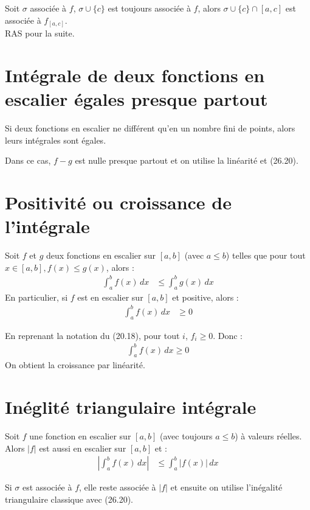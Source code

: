\documentclass[../main.tex]{subfiles}
\begin{document}
\noindent Soit $\sigma$ associée à $f$, $\sigma \cup \{c\}$ est toujours associée à $f$, alors $\sigma \cup \{c\} \cap [a, c]$ est associée à $f_{[a,c]}$. \\
RAS pour la suite. 

\section{Intégrale de deux fonctions en escalier égales presque partout}
\begin{tcolorbox}[title=Propostion 26.23, title filled=false, colframe=lightblue, colback=lightblue!10!white]
    Si deux fonctions en escalier ne différent qu'en un nombre fini de points, alors leurs intégrales sont égales.
\end{tcolorbox}

\noindent Dans ce cas, $f-g$ est nulle presque partout et on utilise la linéarité et (26.20). 

\section{Positivité ou croissance de l'intégrale}
\begin{tcolorbox}[title=Propostion 26.24, title filled=false, colframe=lightblue, colback=lightblue!10!white]
    Soit $f$ et $g$ deux fonctions en escalier sur $[a,b]$ (avec $a\leq b$) telles que pour tout $x\in [a, b], f(x) \leq g(x)$, alors : 
    \begin{align*}
        \int_{a}^{b} f(x) \,dx &\leq \int_{a}^{b} g(x) \,dx
    \end{align*}
    En particulier, si $f$ est en escalier sur $[a,b]$ et positive, alors :
    \begin{align*}
        \int_{a}^{b} f(x) \,dx &\geq 0
    \end{align*}
\end{tcolorbox}

\noindent En reprenant la notation du (20.18), pour tout $i$, $f_i \geq 0$. Donc : 
\begin{align*}
    \int_{a}^{b} f(x) \,dx \geq 0
\end{align*}
On obtient la croissance par linéarité. 

\section{Inéglité triangulaire intégrale}
\begin{tcolorbox}[title=Propostion 26.26, title filled=false, colframe=lightblue, colback=lightblue!10!white]
    Soit $f$ une fonction en escalier sur $[a,b]$ (avec toujours $a\leq b$) à valeurs réelles. Alors $|f|$ est aussi en escalier sur $[a,b]$ et :
    \begin{align*}
        \left|\int_{a}^{b} f(x) \,dx \right| &\leq \int_{a}^{b} |f(x)| \,dx
    \end{align*}
\end{tcolorbox}

\noindent Si $\sigma$ est associée à $f$, elle reste associée à $|f|$ et ensuite on utilise l'inégalité triangulaire classique avec (26.20). 
\end{document}
